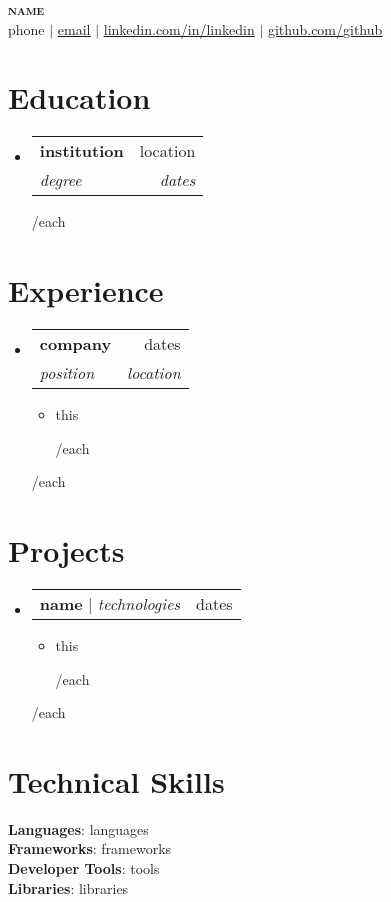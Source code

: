 \documentclass[letterpaper,11pt]{article}
\makeatletter
\newcommand{\resumeItem}[1]{
  \item\small{
    {#1 \vspace{-2pt}}
  }
}
\newcommand{\resumeSubheading}[4]{
  \vspace{-2pt}\item
    \begin{tabular*}{0.97\textwidth}[t]{l@{\extracolsep{\fill}}r}
      \textbf{#1} & #2 \\
      \textit{\small#3} & \textit{\small #4} \\
    \end{tabular*}\vspace{-7pt}
}
\newcommand{\resumeProjectHeading}[2]{
    \item
    \begin{tabular*}{0.97\textwidth}{l@{\extracolsep{\fill}}r}
      \small#1 & #2 \\
    \end{tabular*}\vspace{-7pt}
}
\newcommand{\resumeSubHeadingListStart}{\begin{itemize}[leftmargin=0.15in, label={}]}
\newcommand{\resumeSubHeadingListEnd}{\end{itemize}}
\newcommand{\resumeItemListStart}{\begin{itemize}}
\newcommand{\resumeItemListEnd}{\end{itemize}\vspace{-5pt}}
\makeatother
\begin{document}
\begin{center}
    \textbf{\Huge \scshape {{name}}} \\ \vspace{1pt}
    \small {{phone}} $|$ \href{mailto:{{email}}}{\underline{{{email}}}} $|$ 
    \href{https://linkedin.com/in/{{linkedin}}}{\underline{linkedin.com/in/{{linkedin}}}} $|$
    \href{https://github.com/{{github}}}{\underline{github.com/{{github}}}}
\end{center}


\section{Education}
  \resumeSubHeadingListStart
    {{#each education}}
    \resumeSubheading
      {{{institution}}}{{{location}}}
      {{{degree}}}{{{dates}}}
    {{/each}}
  \resumeSubHeadingListEnd


\section{Experience}
  \resumeSubHeadingListStart
    {{#each experience}}
    \resumeSubheading
      {{{company}}}{{{dates}}}
      {{{position}}}{{{location}}}
      \resumeItemListStart
        {{#each bullets}}
        \resumeItem{{{this}}}
        {{/each}}
      \resumeItemListEnd
    {{/each}}
  \resumeSubHeadingListEnd


\section{Projects}
    \resumeSubHeadingListStart
      {{#each projects}}
      \resumeProjectHeading
          {\textbf{{{name}}} $|$ \emph{{{technologies}}}}{{{dates}}}
          \resumeItemListStart
            {{#each bullets}}
            \resumeItem{{{this}}}
            {{/each}}
          \resumeItemListEnd
      {{/each}}
    \resumeSubHeadingListEnd


\section{Technical Skills}
 \begin{itemize}[leftmargin=0.15in, label={}]
    \small{\item{
     \textbf{Languages}{: {{languages}}} \\
     \textbf{Frameworks}{: {{frameworks}}} \\
     \textbf{Developer Tools}{: {{tools}}} \\
     \textbf{Libraries}{: {{libraries}}}
    }}
 \end{itemize}

\end{document}
